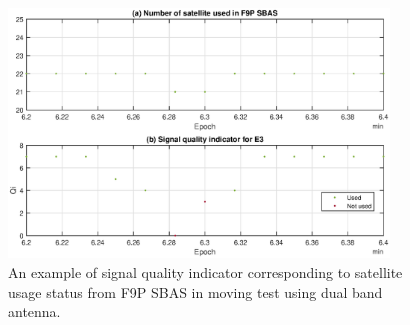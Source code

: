 \documentclass[letterpaper, 10 pt,onecolumn]{article}
\begin{document}
	\begin{figure}[H]		
		\centering		
		\includegraphics[width=0.9\textwidth]{figures/Qi.eps}		
		\caption{An example of signal quality indicator corresponding to satellite usage status from F9P SBAS in moving test using dual band antenna.}		
		\label{fig:qi}	
	\end{figure}
	
	
	
	
\end{document}
